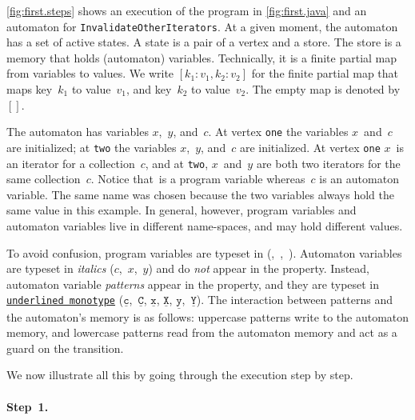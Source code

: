\documentclass[10pt, preprint]{sigplanconf} %
\newcommand{\pattern}[1]{\ensuremath{\mathtt{\underline{#1}}}}
\begin{document}
\autoref{fig:first.steps} shows an execution of the program in \autoref{fig:first.java} and an automaton for \texttt{InvalidateOtherIterators}.
At a given moment, the automaton has a set of active states.
A state is a pair of a vertex and a store.
The store is a memory that holds (automaton) variables.
Technically, it is a finite partial map from variables to values.
We write $[k_1:v_1,k_2:v_2]$ for the finite partial map that maps key~$k_1$ to value~$v_1$, and key~$k_2$ to value~$v_2$.
The empty map is denoted by~$[]$.

The automaton has variables $x$,~$y$, and~$c$.
At vertex \texttt{one} the variables $x$~and~$c$ are initialized;
at \texttt{two} the variables $x$,~$y$, and~$c$ are initialized.
At vertex \texttt{one} $x$~is an iterator for a collection~$c$, and
at \texttt{two}, $x$~and~$y$ are both two iterators for the same collection~$c$.
Notice that~\Verb@c@ is a program variable whereas~$c$ is an automaton variable.
The same name was chosen because the two variables always hold the same value in this example.
In general, however, program variables and automaton variables live in different name-spaces, and may hold different values.

To avoid confusion, program variables are typeset in \Verb@monotype@ (\Verb@c@,~\Verb@i@,~\Verb@j@).
Automaton variables are typeset in \textit{italics} ($c$,~$x$,~$y$) and do \emph{not} appear in the property.
Instead, automaton variable \emph{patterns} appear in the property, and they are typeset in \texttt{\underline{underlined monotype}} (\pattern c,~\pattern C, \pattern x, \pattern X, \pattern y,~\pattern Y).
The interaction between patterns and the automaton's memory is as follows: uppercase patterns write to the automaton memory, and lowercase patterns read from the automaton memory and act as a guard on the transition.

We now illustrate all this by going through the execution step by
step.

\paragraph{Step~1.}
\end{document}
